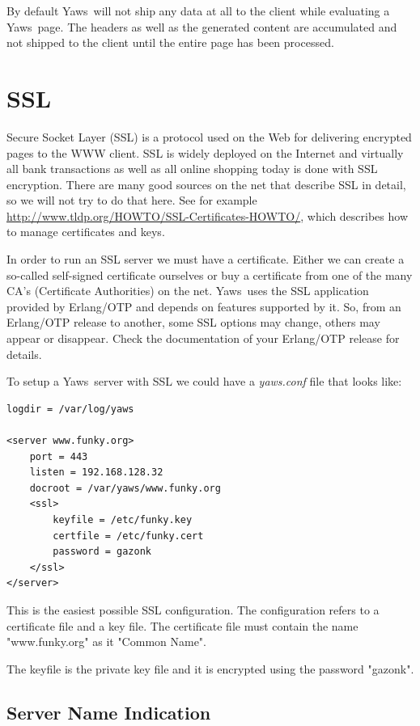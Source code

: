 \documentclass[11pt,oneside,english]{book}
\newcommand{\Yaws}            %
        {{\sc Yaws}}
\begin{document}
By default \Yaws\  will not ship any data at all to the client
while evaluating a \Yaws\  page. The headers as well as the generated
content are accumulated and not shipped to the client until the
entire page has been processed.


\chapter{SSL}

Secure Socket Layer (SSL) is a protocol used on the Web for delivering
encrypted pages to the WWW client. SSL is widely deployed on the
Internet and virtually all bank transactions as well as all online
shopping today is done with SSL encryption. There are many good
sources on the net that describe SSL in detail, so we will not try to
do that here.  See for example
\url{http://www.tldp.org/HOWTO/SSL-Certificates-HOWTO/}, which
describes how to manage certificates and keys.

In order to run an SSL server we must have a certificate. Either we can
create a so-called self-signed certificate ourselves or buy a certificate
from one of the many CA's (Certificate Authorities) on the net. \Yaws\
uses the SSL application provided by Erlang/OTP and depends on features
supported by it. So, from an Erlang/OTP release to another, some SSL
options may change, others may appear or disappear. Check the
documentation of your Erlang/OTP release for details.

To setup a \Yaws\ server with SSL we could have a \textit{yaws.conf}
file that looks like:

\begin{verbatim}
logdir = /var/log/yaws

<server www.funky.org>
    port = 443
    listen = 192.168.128.32
    docroot = /var/yaws/www.funky.org
    <ssl>
        keyfile = /etc/funky.key
        certfile = /etc/funky.cert
        password = gazonk
    </ssl>
</server>
\end{verbatim}

This is the easiest possible SSL configuration. The configuration
refers to a certificate file and a key file. The certificate file
must contain the name "www.funky.org" as it "Common Name".

The keyfile is the private key file and it is encrypted using
the password "gazonk".


\section{Server Name Indication}
\end{document}

